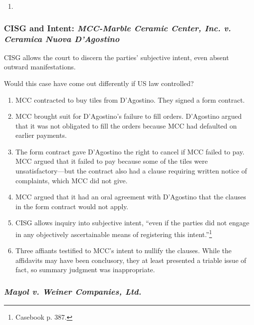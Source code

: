 \begin{enumerate}
    \item %
\end{enumerate}

\subsubsection{CISG and Intent: \emph{MCC-Marble Ceramic Center, Inc. v. 
Ceramica Nuova D'Agostino}}

CISG allows the court to discern the parties' subjective intent, even absent 
outward manifestations.

Would this case have come out differently if US law controlled?

\begin{enumerate}
    \item MCC contracted to buy tiles from D'Agostino. They signed a form 
    contract.
    \item MCC brought suit for D'Agostino's failure to fill orders. D'Agostino 
    argued that it was not obligated to fill the orders because MCC had 
    defaulted on earlier payments.
    \item The form contract gave D'Agostino the right to cancel if MCC failed 
    to pay. MCC argued that it failed to pay because some of the tiles were 
    unsatisfactory---but the contract also had a clause requiring written 
    notice of complaints, which MCC did not give.
    \item MCC argued that it had an oral agreement with D'Agostino that the 
    clauses in the form contract would not apply.
    \item CISG allows inquiry into subjective intent, ``even if the parties 
    did not engage in any objectively ascertainable means of registering this 
    intent.''\footnote{Casebook p. 387.}
    \item Three affiants testified to MCC's intent to nullify the clauses. 
    While the affidavits may have been conclusory, they at least presented a 
    triable issue of fact, so summary judgment was inappropriate.
\end{enumerate}

\subsubsection{\emph{Mayol v. Weiner Companies, Ltd.}}

